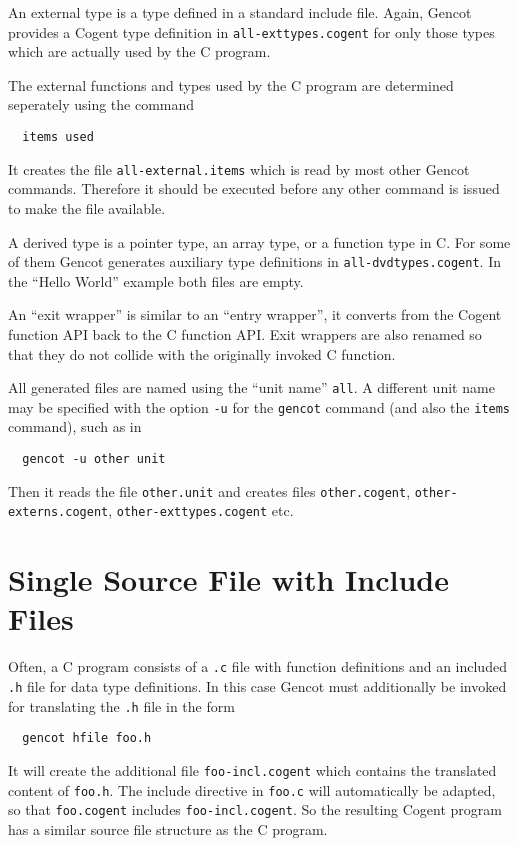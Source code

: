 \documentclass[a4paper]{report}
\newcommand{\code}[1]{\textnormal{\texttt{#1}}}
\begin{document}
An external type is a type defined in a standard include file. Again, Gencot provides a Cogent type definition in 
\code{all-exttypes.cogent} for only those types which are actually used by the C program. 

The external functions and types used by the C program are determined seperately using the command
\begin{verbatim}
  items used
\end{verbatim}
It creates the file \code{all-external.items} which is read by most other Gencot commands. Therefore it should be executed
before any other command is issued to make the file available.

A derived type is a pointer type, an array type, or a function type in C. For 
some of them Gencot generates auxiliary type definitions in \code{all-dvdtypes.cogent}. In the ``Hello World'' example 
both files are empty.

An ``exit wrapper'' is similar to an ``entry wrapper'', it converts from the Cogent function API back to the C function API.
Exit wrappers are also renamed so that they do not collide with the originally invoked C function.

All generated files are named using the ``unit name'' \code{all}. A different unit name may be specified with the option 
\code{-u} for the \code{gencot} command (and also the \code{items} command), such as in
\begin{verbatim}
  gencot -u other unit
\end{verbatim}
Then it reads the file \code{other.unit} and creates files \code{other.cogent}, \code{other-externs.cogent}, 
\code{other-exttypes.cogent} etc.

\section{Single Source File with Include Files}
\label{struct-include}

Often, a C program consists of a \code{.c} file with function definitions and an included \code{.h} file for data type 
definitions. In this case Gencot must additionally be invoked for translating the \code{.h} file in the form
\begin{verbatim}
  gencot hfile foo.h
\end{verbatim}
It will create the additional file \code{foo-incl.cogent} which contains the translated content of \code{foo.h}. The 
include directive in \code{foo.c} will automatically be adapted, so that \code{foo.cogent} includes \code{foo-incl.cogent}.
So the resulting Cogent program has a similar source file structure as the C program.
\end{document}
